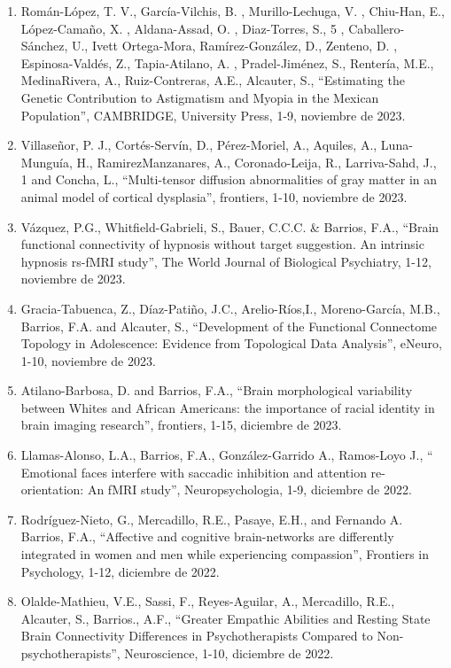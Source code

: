 \begin{enumerate}
\item Román-López, T. V., García-Vilchis, B. , Murillo-Lechuga, V. , Chiu-Han, E., López-Camaño, X. , Aldana-Assad, O. , 
Diaz-Torres, S., 5 , Caballero-Sánchez, U., Ivett Ortega-Mora, Ramírez-González, D., Zenteno, D. , Espinosa-Valdés, Z., 
Tapia-Atilano, A. , Pradel-Jiménez, S., Rentería, M.E., MedinaRivera, A., Ruiz-Contreras, A.E., Alcauter, S., “Estimating 
the Genetic Contribution to Astigmatism and Myopia in the Mexican Population”, CAMBRIDGE, University Press, 1-9, noviembre de 2023.

\item Villaseñor, P. J., Cortés-Servín, D., Pérez-Moriel, A., Aquiles, A., Luna-Munguía, H., RamirezManzanares, A., 
Coronado-Leija, R., Larriva-Sahd, J., 1 and Concha, L., “Multi-tensor diffusion abnormalities of gray matter in an animal 
model of cortical dysplasia”, frontiers, 1-10, noviembre de 2023.

\item Vázquez, P.G., Whitfield-Gabrieli, S., Bauer, C.C.C. \& Barrios, F.A., “Brain functional connectivity of hypnosis 
without target suggestion. An intrinsic hypnosis rs-fMRI study”, The World Journal of Biological Psychiatry, 1-12, noviembre de 2023.

\item Gracia-Tabuenca, Z., Díaz-Patiño, J.C., Arelio-Ríos,I., Moreno-García, M.B., Barrios, F.A. and Alcauter, S., 
“Development of the Functional Connectome Topology in Adolescence: Evidence from Topological Data Analysis”, eNeuro, 1-10, 
noviembre de 2023.

\item Atilano-Barbosa, D. and Barrios, F.A., “Brain morphological variability between Whites and African Americans: the 
importance of racial identity in brain imaging research”, frontiers, 1-15, diciembre de 2023.

\item Llamas-Alonso, L.A., Barrios, F.A., González-Garrido A., Ramos-Loyo J., “ Emotional faces interfere with saccadic 
inhibition and attention re-orientation: An fMRI study”, Neuropsychologia, 1-9, diciembre de 2022.

\item Rodríguez-Nieto, G., Mercadillo, R.E., Pasaye, E.H., and Fernando A. Barrios, F.A., “Affective and cognitive 
brain-networks are differently integrated in women and men while experiencing compassion”, Frontiers in Psychology, 1-12, diciembre de 2022.

\item Olalde-Mathieu, V.E., Sassi, F., Reyes-Aguilar, A., Mercadillo, R.E., Alcauter, S., Barrios., A.F., 
“Greater Empathic Abilities and Resting State Brain Connectivity Differences in Psychotherapists Compared to 
Non-psychotherapists”, Neuroscience, 1-10, diciembre de 2022.


\end{enumerate}
